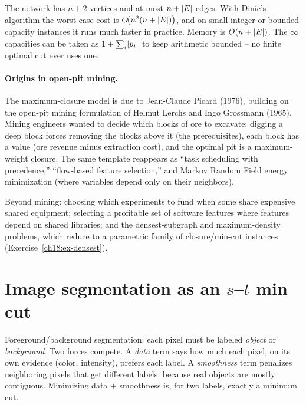 \begin{complexitybox}
The network has $n+2$ vertices and at most $n + \lvert E\rvert$ edges. With Dinic's algorithm the worst-case cost is $O\!\big(n^2(n+\lvert E\rvert)\big)$, and on small-integer or bounded-capacity instances it runs much faster in practice. Memory is $O(n+\lvert E\rvert)$. The $\infty$ capacities can be taken as $1 + \sum_i \lvert p_i\rvert$ to keep arithmetic bounded -- no finite optimal cut ever uses one.
\end{complexitybox}

\paragraph{Origins in open-pit mining.}
The maximum-closure model is due to Jean-Claude Picard (1976), building on the open-pit mining formulation of Helmut Lerchs and Ingo Grossmann (1965). Mining engineers wanted to decide which blocks of ore to excavate: digging a deep block forces removing the blocks above it (the prerequisites), each block has a value (ore revenue minus extraction cost), and the optimal pit is a maximum-weight closure. The same template reappears as ``task scheduling with precedence,'' ``flow-based feature selection,'' and Markov Random Field energy minimization (where variables depend only on their neighbors).

\begin{applicationbox}
Beyond mining: choosing which experiments to fund when some share expensive shared equipment; selecting a profitable set of software features where features depend on shared libraries; and the densest-subgraph and maximum-density problems, which reduce to a parametric family of closure/min-cut instances (Exercise~\ref{ch18:ex-densest}).
\end{applicationbox}

\section{Image segmentation as an \texorpdfstring{$s$--$t$}{s-t} min cut}
\label{ch18:segmentation}

Foreground/background segmentation: each pixel must be labeled \emph{object} or \emph{background}. Two forces compete. A \emph{data} term says how much each pixel, on its own evidence (color, intensity), prefers each label. A \emph{smoothness} term penalizes neighboring pixels that get different labels, because real objects are mostly contiguous. Minimizing data $+$ smoothness is, for two labels, exactly a minimum cut.

